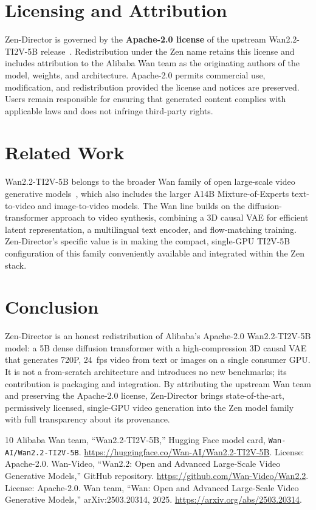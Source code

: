\documentclass[11pt,a4paper]{article}
\begin{document}
\section{Licensing and Attribution}

Zen-Director is governed by the \textbf{Apache-2.0 license} of the upstream
Wan2.2-TI2V-5B release~\cite{wan22hf,wan22github}. Redistribution under the Zen name retains
this license and includes attribution to the Alibaba Wan team as the originating authors of the
model, weights, and architecture. Apache-2.0 permits commercial use, modification, and
redistribution provided the license and notices are preserved. Users remain responsible for
ensuring that generated content complies with applicable laws and does not infringe third-party
rights.

\section{Related Work}

Wan2.2-TI2V-5B belongs to the broader Wan family of open large-scale video generative
models~\cite{wan21paper,wan22github}, which also includes the larger A14B Mixture-of-Experts
text-to-video and image-to-video models. The Wan line builds on the diffusion-transformer
approach to video synthesis, combining a 3D causal VAE for efficient latent representation, a
multilingual text encoder, and flow-matching training. Zen-Director's specific value is in
making the compact, single-GPU TI2V-5B configuration of this family conveniently available and
integrated within the Zen stack.

\section{Conclusion}

Zen-Director is an honest redistribution of Alibaba's Apache-2.0 Wan2.2-TI2V-5B model: a 5B
dense diffusion transformer with a high-compression 3D causal VAE that generates 720P, 24~fps
video from text or images on a single consumer GPU. It is not a from-scratch architecture and
introduces no new benchmarks; its contribution is packaging and integration. By attributing the
upstream Wan team and preserving the Apache-2.0 license, Zen-Director brings state-of-the-art,
permissively licensed, single-GPU video generation into the Zen model family with full
transparency about its provenance.

\begin{thebibliography}{10}
 Alibaba Wan team, ``Wan2.2-TI2V-5B,'' Hugging Face model card, \texttt{Wan-AI/Wan2.2-TI2V-5B}. \url{https://huggingface.co/Wan-AI/Wan2.2-TI2V-5B}. License: Apache-2.0.
 Wan-Video, ``Wan2.2: Open and Advanced Large-Scale Video Generative Models,'' GitHub repository. \url{https://github.com/Wan-Video/Wan2.2}. License: Apache-2.0.
 Wan team, ``Wan: Open and Advanced Large-Scale Video Generative Models,'' arXiv:2503.20314, 2025. \url{https://arxiv.org/abs/2503.20314}.
\end{thebibliography}
\end{document}
